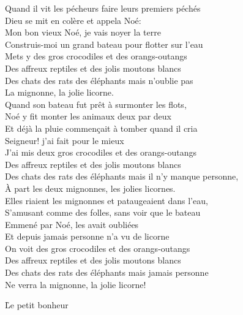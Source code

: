 \documentclass{novel}
\begin{document}
Quand il vit les pécheurs faire leurs premiers péchés \\
Dieu se mit en colère et appela Noé: \\
Mon bon vieux Noé, je vais noyer la terre \\
Construis-moi un grand bateau pour flotter sur l'eau \\

Mets y des gros crocodiles et des orangs-outangs \\
Des affreux reptiles et des jolis moutons blancs \\
Des chats des rats des éléphants mais n'oublie pas \\
La mignonne, la jolie licorne. \\

Quand son bateau fut prêt à surmonter les flots, \\
Noé y fit monter les animaux deux par deux \\
Et déjà la pluie commençait à tomber quand il cria \\
Seigneur! j'ai fait pour le mieux \\

J'ai mis deux gros crocodiles et des orangs-outangs \\
Des affreux reptiles et des jolis moutons blancs \\
Des chats des rats des éléphants mais il n'y manque personne, \\
À part les deux mignonnes, les jolies licornes. \\

Elles riaient les mignonnes et pataugeaient dans l'eau, \\
S'amusant comme des folles, sans voir que le bateau \\
Emmené par Noé, les avait oubliées \\
Et depuis jamais personne n'a vu de licorne \\

On voit des gros crocodiles et des orangs-outangs \\
Des affreux reptiles et des jolis moutons blancs \\
Des chats des rats des éléphants mais jamais personne \\
Ne verra la mignonne, la jolie licorne!

\newpage
\normalsize
\h*{Le petit bonheur}
\end{document}
